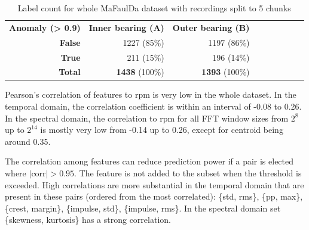 \begin{table}[ht]
\begin{tabular}{rrrrrllll}
\multicolumn{1}{|l|}{\textbf{Anomaly (> 0.9)}}                                                                                          & \multicolumn{1}{l|}{\textbf{Inner bearing (A)}} & \multicolumn{1}{l|}{\textbf{Outer bearing (B)}} \\ \cline{1-3}
\multicolumn{1}{|r|}{\textbf{False}}                                                                            & \multicolumn{1}{r|}{1227 (85\%)}                 & \multicolumn{1}{r|}{1197 (86\%)}         \\ \cline{1-3}
\multicolumn{1}{|r|}{\textbf{True}}                                                                             & \multicolumn{1}{r|}{211 (15\%)}                 & \multicolumn{1}{r|}{196 (14\%)}         \\ \cline{1-3}
\multicolumn{1}{|r|}{\textbf{Total}}                                                                            & \multicolumn{1}{r|}{\textbf{1438} (100\%)}                       & \multicolumn{1}{r|}{\textbf{1393} (100\%)}               \\ \cline{1-3}
\end{tabular}
\caption{Label count for whole MaFaulDa dataset with recordings split to 5 chunks}
\label{tab:observation-counts}
\end{table}

Pearson's correlation of features to rpm is very low in the whole dataset. In the temporal domain, the correlation coefficient is within an interval of -0.08 to 0.26. In the spectral domain, the correlation to rpm for all FFT window sizes from $2^8$ up to $2^{14}$ is mostly very low from -0.14 up to 0.26, except for centroid being around 0.35.

The correlation among features can reduce prediction power if a pair is elected where $|\mathrm{corr}| > 0.95$. The feature is not added to the subset when the threshold is exceeded. High correlations are more substantial in the temporal domain that are present in these pairs (ordered from the most correlated): \{std, rms\}, \{pp, max\}, \{crest, margin\}, \{impulse, std\}, \{impulse, rms\}. In the spectral domain set \{skewness, kurtosis\} has a strong correlation.

